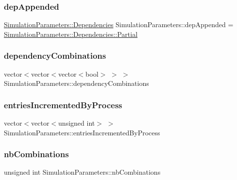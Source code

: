 \subsubsection{\texorpdfstring{dep\+Appended}{depAppended}}
{\footnotesize\ttfamily \hyperlink{classSimulationParameters_afb3b6aaecd4b19ef1991c870c8402dff}{Simulation\+Parameters\+::\+Dependencies} Simulation\+Parameters\+::dep\+Appended = \hyperlink{classSimulationParameters_afb3b6aaecd4b19ef1991c870c8402dffa44ffd38a6dea695cbe2b34efdcc6cf27}{Simulation\+Parameters\+::\+Dependencies\+::\+Partial}\hspace{0.3cm}{\ttfamily [static]}}

\mbox{\label{classSimulationParameters_a1e884901020cad738db1aceaa6700d9f}} 
\subsubsection{\texorpdfstring{dependency\+Combinations}{dependencyCombinations}}
{\footnotesize\ttfamily vector$<$vector$<$vector$<$bool$>$ $>$ $>$ Simulation\+Parameters\+::dependency\+Combinations}

\mbox{\label{classSimulationParameters_a069a04754400916fc6b5f9f5baff2d32}} 
\subsubsection{\texorpdfstring{entries\+Incremented\+By\+Process}{entriesIncrementedByProcess}}
{\footnotesize\ttfamily vector$<$vector$<$unsigned int$>$ $>$ Simulation\+Parameters\+::entries\+Incremented\+By\+Process}

\mbox{\label{classSimulationParameters_a8f1c0671b131ea807d8a04cd9b15d9b8}} 
\subsubsection{\texorpdfstring{nb\+Combinations}{nbCombinations}}
{\footnotesize\ttfamily unsigned int Simulation\+Parameters\+::nb\+Combinations}

